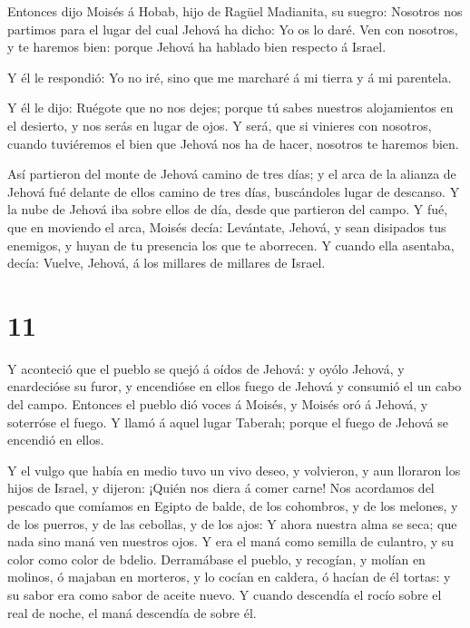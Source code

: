  Entonces dijo Moisés á Hobab, hijo de Ragüel Madianita, su
suegro: Nosotros nos partimos para el lugar del cual Jehová ha dicho: Yo
os lo daré. Ven con nosotros, y te haremos bien: porque Jehová ha
hablado bien respecto á Israel.

 Y él le respondió: Yo no iré, sino que me marcharé á mi
tierra y á mi parentela.

 Y él le dijo: Ruégote que no nos dejes; porque tú sabes
nuestros alojamientos en el desierto, y nos serás en lugar de ojos.
 Y será, que si vinieres con nosotros, cuando tuviéremos el
bien que Jehová nos ha de hacer, nosotros te haremos bien.

 Así partieron del monte de Jehová camino de tres días; y
el arca de la alianza de Jehová fué delante de ellos camino de tres
días, buscándoles lugar de descanso.  Y la nube de Jehová
iba sobre ellos de día, desde que partieron del campo.  Y
fué, que en moviendo el arca, Moisés decía: Levántate, Jehová, y sean
disipados tus enemigos, y huyan de tu presencia los que te aborrecen.
 Y cuando ella asentaba, decía: Vuelve, Jehová, á los
millares de millares de Israel.

\hypertarget{section-10}{%
\section{11}\label{section-10}}

 Y aconteció que el pueblo se quejó á oídos de Jehová: y
oyólo Jehová, y enardecióse su furor, y encendióse en ellos fuego de
Jehová y consumió el un cabo del campo.  Entonces el pueblo
dió voces á Moisés, y Moisés oró á Jehová, y soterróse el fuego.
 Y llamó á aquel lugar Taberah; porque el fuego de Jehová se
encendió en ellos.

 Y el vulgo que había en medio tuvo un vivo deseo, y
volvieron, y aun lloraron los hijos de Israel, y dijeron: ¡Quién nos
diera á comer carne!  Nos acordamos del pescado que comíamos
en Egipto de balde, de los cohombros, y de los melones, y de los
puerros, y de las cebollas, y de los ajos:  Y ahora nuestra
alma se seca; que nada sino maná ven nuestros ojos.  Y era
el maná como semilla de culantro, y su color como color de bdelio.
 Derramábase el pueblo, y recogían, y molían en molinos, ó
majaban en morteros, y lo cocían en caldera, ó hacían de él tortas: y su
sabor era como sabor de aceite nuevo.  Y cuando descendía el
rocío sobre el real de noche, el maná descendía de sobre él.

